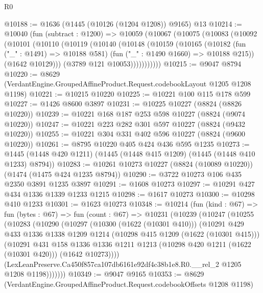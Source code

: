 \begin{lexlean}{R0}
\begin{coremodule}
@10188 := @1636 (@1445 (@10126 (@1204 @1208)) @9165) @13
@10214 := @10040
    (fun (subtract : @1200) =>
    @10059
      (@10067
        (@10075
          (@10083
            (@10092
              (@10101
                (@10110
                  (@10119
                    (@10140
                      (@10148
                        (@10159
                          (@10165
                            (@10182
                              (fun ("_" : @1491) => @10188 @581)
                              (fun ("_" : @1490 @1660) => @10188 @215))
                            (@1642 @10129)))
                        (@3789 @121 @10053)))))))))))
@10215 := @9047 @8794
@10220 := @8629 (VerdantEngine.GroupedAffineProduct.Request.codebookLayout @1205 @1208 @1198)
@10221 := @10215 @10220
@10225 := @10221 @100 @115 @178 @599
@10227 := @1426 @8600 @3897
@10231 := @10225 @10227 (@8824 (@8826 @10220))
@10239 := @10221 @168 @187 @253 @598 @10227 (@8824 (@9074 @10220))
@10247 := @10221 @223 @282 @301 @597 @10227 (@8824 (@9432 @10220))
@10255 := @10221 @304 @331 @402 @596 @10227 (@8824 (@9600 @10220))
@10261 := @8795 @10220 @405 @424 @436 @595 @1235
@10273 := @1445 (@1448 @420 @1211) (@1445 (@1448 @415 @1209) (@1445 (@1448 @410 @1233) @8794))
@10283 := @10261 @10273 @10227 (@8824 (@10089 @10220)) (@1474 (@1475 @424 @1235 @8794))
@10290 := @3722 @10273 @106 @435 @2350 @3891 @1235 @3897
@10291 := @1608 @10273
@10297 := @10291 @427 @434 @1336 @1339 @1233 @1215
@10298 := @1617 @10273
@10300 := @10298 @410 @1233
@10301 := @1623 @10273
@10348 := @10214
    (fun (kind : @67) =>
    fun (bytes : @67) =>
    fun (count : @67) =>
    @10231
      (@10239
        (@10247
          (@10255
            (@10283
              (@10290
                (@10297
                  (@10300 (@1622 (@10301 @410)))
                  (@10291
                    @429
                    @433
                    @1336
                    @1338
                    @1209
                    @1214
                    (@10298 @415 @1209 (@1622 (@10301 @415)))
                    (@10291
                      @431
                      @158
                      @1336
                      @1336
                      @1211
                      @1213
                      (@10298 @420 @1211 (@1622 (@10301 @420)))
                      (@1642 @10273))))
                (LexLeanPreserve.Ca450f857ca107db6161e92df4c38b1e8.R0.__rel_2
                  @1205
                  @1208
                  @1198)))))))
@10349 := @9047 @9165
@10353 := @8629 (VerdantEngine.GroupedAffineProduct.Request.codebookOffsets @1208 @1198)

\end{coremodule}
\end{lexlean}

